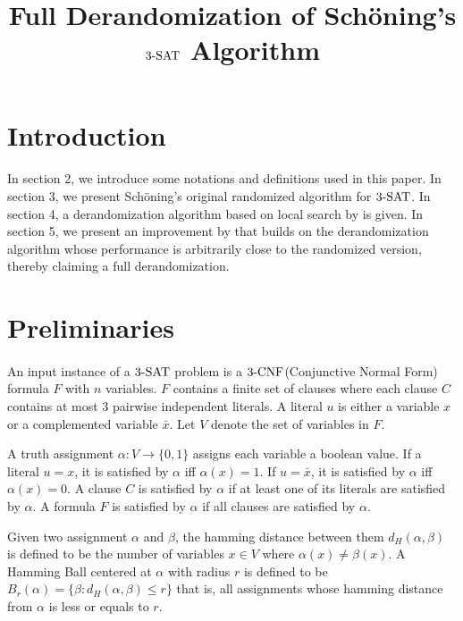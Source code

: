 \documentclass{article}
\title{Full Derandomization of Sch\"{o}ning's $\SAT$ Algorithm}
\author{}
\date{}
\newcommand{\SAT}{\textnormal{$3$-SAT}}
\newcommand{\CNF}{\textnormal{$3$-CNF}}
\newcommand{\dist}[2]{d_H(#1,#2)}
\newcommand{\ball}[2]{B_{#1}(#2)}
\begin{document}
\maketitle

\section{Introduction}
\paragraph{} In section 2, we introduce some notations and definitions used in this paper. In section 3, we present Sch\"{o}ning's original randomized algorithm\cite{Schoning99} for $\SAT$. In section 4, a derandomization algorithm based on local search by \cite{Dantsin02} is given. In section 5, we present an improvement by \cite{Moser11} that builds on the derandomization algorithm whose performance is arbitrarily close to the randomized version, thereby claiming a full derandomization.

\section{Preliminaries}
\paragraph{} An input instance of a $\SAT$ problem is a $\CNF$(Conjunctive Normal Form) formula $F$ with $n$ variables. $F$ contains a finite set of clauses where each clause $C$ contains at most $3$ pairwise independent literals. A literal $u$ is either a variable $x$ or a complemented variable $\bar{x}$. Let $V$ denote the set of variables in $F$. \par 
A truth assignment $\alpha: V\rightarrow \{0,1\}$ assigns each variable a boolean value. If a literal $u = x$, it is satisfied by $\alpha$ iff $\alpha(x) = 1$. If $u = \bar{x}$, it is satisfied by $\alpha$ iff $\alpha(x) = 0$. A clause $C$ is satisfied by $\alpha$ if at least one of its literals are satisfied by $\alpha$. A formula $F$ is satisfied by $\alpha$ if all clauses are satisfied by $\alpha$. \par 
Given two assignment $\alpha$ and $\beta$, the hamming distance between them $\dist{\alpha}{\beta}$ is defined to be the number of variables $x \in V$ where $\alpha(x) \neq \beta(x)$. A Hamming Ball centered at $\alpha$ with radius $r$ is defined to be $\ball{r}{\alpha} = \{\beta: \dist{\alpha}{\beta} \leq r\}$ that is, all assignments whose hamming distance from $\alpha$ is less or equals to $r$. \\
\end{document}

